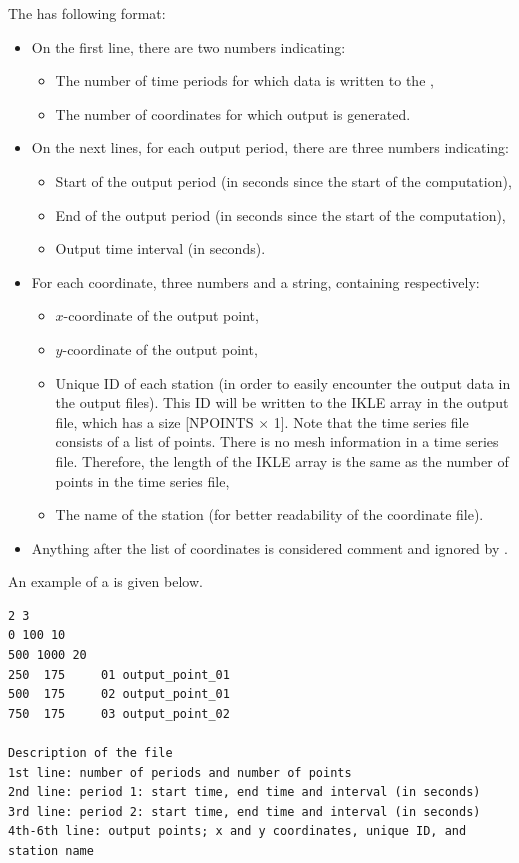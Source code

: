 The  has following format:
\begin {itemize}
\item On the first line, there are two numbers indicating:
\begin{itemize}
\item The number of time periods for which data is written to the
,
\item The number of coordinates for which output is generated.
\end {itemize}
\item On the next lines, for each output period, there are three numbers
indicating:
\begin{itemize}
\item Start of the output period (in seconds since the start of the computation),
\item End of the output period (in seconds since the start of the computation),
\item Output time interval (in seconds).
\end {itemize}
\item For each coordinate, three numbers and a string, containing respectively:
\begin{itemize}
\item $x$-coordinate of the output point,
\item $y$-coordinate of the output point,
\item Unique ID of each station (in order to easily encounter the output
data in the output files).
This ID will be written to the IKLE array in the output file, which has a size
[NPOINTS $\times$ 1].
Note that the time series file consists of a list of points.
There is no mesh information in a time series file.
Therefore, the length of the IKLE array is the same as the number of points in
the time series file,
\item The name of the station (for better readability of the coordinate file).
\end{itemize}
\item Anything after the list of coordinates is considered comment and ignored
by \tel.
\end {itemize}

An example of a  is given below.

\begin{verbatim}
2 3
0 100 10
500 1000 20
250  175     01 output_point_01
500  175     02 output_point_01
750  175     03 output_point_02

Description of the file
1st line: number of periods and number of points
2nd line: period 1: start time, end time and interval (in seconds)
3rd line: period 2: start time, end time and interval (in seconds)
4th-6th line: output points; x and y coordinates, unique ID, and station name
\end{verbatim}


